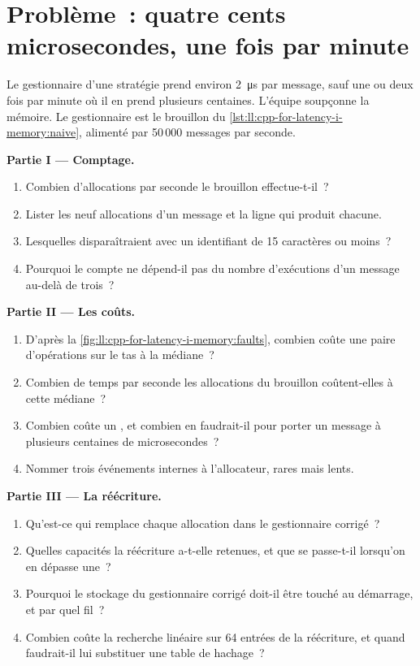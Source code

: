\section{Problème~: quatre cents microsecondes, une fois par minute}

\begin{problem}\label{pb:ll:cpp-for-latency-i-memory:1}
Le gestionnaire d'une stratégie prend environ \qty{2}{\micro\second} par message, sauf une ou deux fois par minute où il en prend plusieurs
centaines. L'équipe soupçonne la mémoire. Le gestionnaire est le brouillon du \cref{lst:ll:cpp-for-latency-i-memory:naive}, alimenté par 50\,000
messages par seconde.

\medskip\noindent\textbf{Partie I --- Comptage.}
\begin{enumerate}
\item Combien d'allocations par seconde le brouillon effectue-t-il~?
\item Lister les neuf allocations d'un message et la ligne qui produit chacune.
\item Lesquelles disparaîtraient avec un identifiant de 15 caractères ou moins~?
\item Pourquoi le compte ne dépend-il pas du nombre d'exécutions d'un message au-delà de trois~?
\end{enumerate}

\medskip\noindent\textbf{Partie II --- Les coûts.}
\begin{enumerate}[resume]
\item D'après la \cref{fig:ll:cpp-for-latency-i-memory:faults}, combien coûte une paire d'opérations sur le tas à la médiane~?
\item Combien de temps par seconde les allocations du brouillon coûtent-elles à cette médiane~?
\item Combien coûte un , et combien en faudrait-il pour porter un message à plusieurs centaines de microsecondes~?
\item Nommer trois événements internes à l'allocateur, rares mais lents.
\end{enumerate}

\medskip\noindent\textbf{Partie III --- La réécriture.}
\begin{enumerate}[resume]
\item Qu'est-ce qui remplace chaque allocation dans le gestionnaire corrigé~?
\item Quelles capacités la réécriture a-t-elle retenues, et que se passe-t-il lorsqu'on en dépasse une~?
\item Pourquoi le stockage du gestionnaire corrigé doit-il être touché au démarrage, et par quel fil~?
\item Combien coûte la recherche linéaire sur 64 entrées de la réécriture, et quand faudrait-il lui substituer une table de hachage~?
\end{enumerate}


\end{problem}
